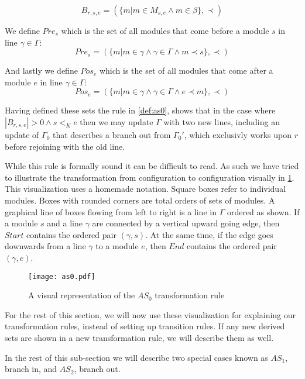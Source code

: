 \[B_{r,s,e} = (\{m |m \in M_{s,e} \land m \in \beta\}, \prec)\]

We define $Pre_{s}$ which is the set of all modules that come before a module $s$ in line $\gamma \in \Gamma$:
\[Pre_{s} = (\{m | m \in \gamma \land \gamma \in \Gamma \land m \prec s\}, \prec)\]

And lastly we define $Pos_{e}$ which is the set of all modules that come after a module $e$  in line $\gamma \in \Gamma$:
\[Pos_{e} = (\{m | m \in \gamma \land \gamma \in \Gamma \land e \prec  m \}, \prec)\]

Having defined these sets the rule in \cref{def:as0}, shows that in the case where $|B_{r,s,e}| > 0 \land s <_K e$ then we may update $\Gamma$ with two new lines, including an update of $\Gamma_0$ that describes a branch out from $\Gamma_0'$, which exclusivly works upon $r$ before rejoining with the old line.   

While this rule is formally sound it can be difficult to read. As such we have tried to illustrate the transformation from configuration to configuration visually in \cref{fig:as0}. This visualization uses a homemade notation. Square boxes refer to individual modules. Boxes with rounded corners are total orders of sets of modules. A graphical line of boxes flowing from left to right is a line in $\Gamma$ ordered as shown. If a module $s$ and a line $\gamma$ are connected by a vertical upward going edge, then $Start$ contains the ordered pair $(\gamma ,s)$. At the same time, if the edge goes downwards from a line $\gamma$ to a module $e$, then $End$ contains the ordered pair $(\gamma ,e)$.


\begin{figure}[H]
\centering
\texttt{[image: as0.pdf]}
\caption{A visual representation of the $AS_0$ transformation rule}
\label{fig:as0}
\end{figure}

For the rest of this section, we will now use these visualization for explaining our transformation rules, instead of setting up transition rules. If any new derived sets are shown in a new transformation rule, we will describe them as well.  

In the rest of this sub-section we will describe two special cases known as $AS_1$, branch in, and $AS_2$,  branch out. 

